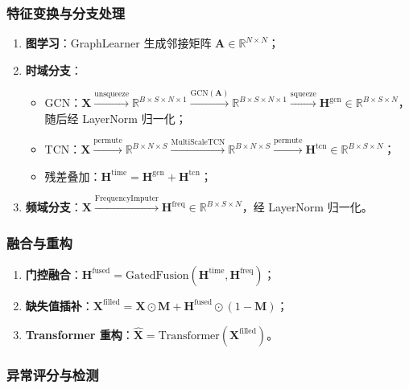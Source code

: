 \documentclass[UTF8]{ctexart}
\begin{document}
\subsubsection{特征变换与分支处理}

\begin{enumerate}
    \item \textbf{图学习}：GraphLearner 生成邻接矩阵 $\mathbf{A} \in \mathbb{R}^{N \times N}$；
    \item \textbf{时域分支}：
    \begin{itemize}
        \item GCN：$\mathbf{X} \xrightarrow{\text{unsqueeze}} \mathbb{R}^{B \times S \times N \times 1} \xrightarrow{\text{GCN}(\mathbf{A})} \mathbb{R}^{B \times S \times N \times 1} \xrightarrow{\text{squeeze}} \mathbf{H}^{\text{gcn}} \in \mathbb{R}^{B \times S \times N}$，随后经 LayerNorm 归一化；
        \item TCN：$\mathbf{X} \xrightarrow{\text{permute}} \mathbb{R}^{B \times N \times S} \xrightarrow{\text{MultiScaleTCN}} \mathbb{R}^{B \times N \times S} \xrightarrow{\text{permute}} \mathbf{H}^{\text{tcn}} \in \mathbb{R}^{B \times S \times N}$；
        \item 残差叠加：$\mathbf{H}^{\text{time}} = \mathbf{H}^{\text{gcn}} + \mathbf{H}^{\text{tcn}}$；
    \end{itemize}
    \item \textbf{频域分支}：$\mathbf{X} \xrightarrow{\text{FrequencyImputer}} \mathbf{H}^{\text{freq}} \in \mathbb{R}^{B \times S \times N}$，经 LayerNorm 归一化。
\end{enumerate}

\subsubsection{融合与重构}

\begin{enumerate}
    \item \textbf{门控融合}：$\mathbf{H}^{\text{fused}} = \mathrm{GatedFusion}(\mathbf{H}^{\text{time}}, \mathbf{H}^{\text{freq}})$；
    \item \textbf{缺失值插补}：$\mathbf{X}^{\text{filled}} = \mathbf{X} \odot \mathbf{M} + \mathbf{H}^{\text{fused}} \odot (1 - \mathbf{M})$；
    \item \textbf{Transformer 重构}：$\hat{\mathbf{X}} = \mathrm{Transformer}(\mathbf{X}^{\text{filled}})$。
\end{enumerate}

\subsubsection{异常评分与检测}
\end{document}
